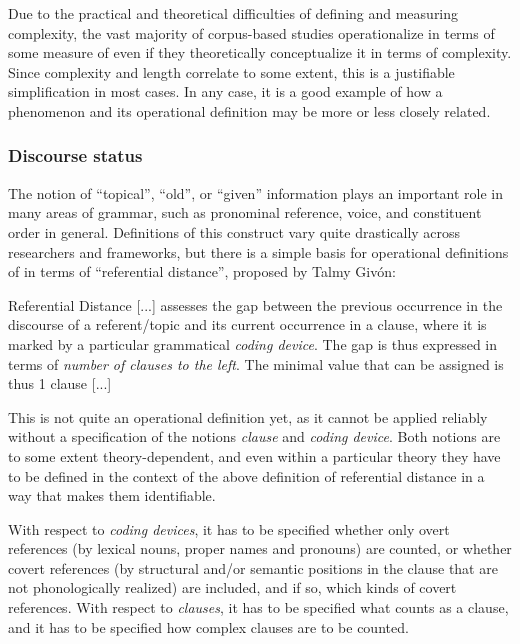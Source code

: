 Due to the practical and theoretical difficulties of defining and measuring  complexity,  the vast majority of corpus\hyp{}based studies operationalize   in terms of some measure of   even if they theoretically conceptualize it in terms of complexity. Since complexity  and length correlate  to some extent, this is a justifiable simplification in most cases. In any case, it is a good example of how a phenomenon and its operational  definition may be more or less closely related.

\subsubsection{Discourse status}
\label{sec:operationalizingdiscoursestatus}

The notion of ``topical'', ``old'', or ``given'' information plays an important role in many areas of grammar,  such as pronominal  reference, voice, and constituent order  in general. Definitions of this construct vary quite drastically across researchers and frameworks, but there is a simple basis for operational  definitions of   in terms of ``referential distance'',  proposed by Talmy Givón:

\begin{exe}
\ex Referential Distance  [...] assesses the gap between the previous occurrence in the discourse of a referent\slash topic and its current occurrence in a clause, where it is marked by a particular grammatical \emph{coding device}. The gap is thus expressed in terms of \emph{number of clauses to the left}. The minimal value that can be assigned is thus 1 clause [...] \citep[13]{givon_topic_1983}
\label{ex:referentialdistance}
\end{exe}

This is not quite an operational  definition yet, as it cannot be applied reliably  without a specification of the notions \emph{clause} and \emph{coding device}. Both notions are to some extent theory\hyp{}dependent, and even within a particular theory they have to be defined in the context of the above definition of referential distance  in a way that makes them identifiable.

With respect to \emph{coding devices}, it has to be specified whether only overt references (by lexical nouns,  proper names and pronouns)  are counted, or whether covert references (by structural and\slash or semantic  positions in the clause that are not phonologically realized) are included, and if so, which kinds of covert references. With respect to \emph{clauses}, it has to be specified what counts as a clause, and it has to be specified how complex  clauses are to be counted.

